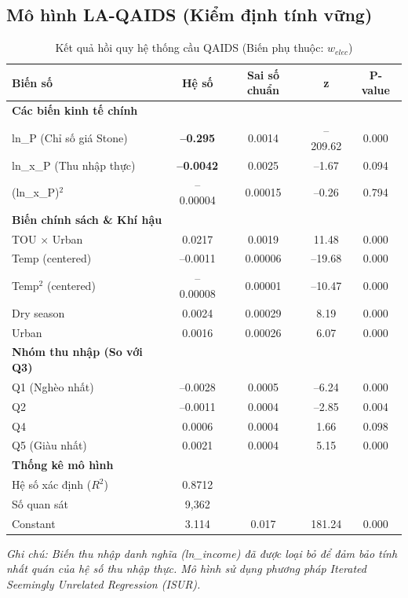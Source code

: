 \documentclass[12pt,a4paper,oneside]{article}
\begin{document}
\subsection{Mô hình LA-QAIDS (Kiểm định tính vững)}
\begin{table}[H]
	\centering
	\caption{Kết quả hồi quy hệ thống cầu QAIDS (Biến phụ thuộc: $w_{elec}$)}
	\label{tab:qaids_final}
	\begin{tabular}{l c c c c}
		\toprule
		\textbf{Biến số} & \textbf{Hệ số} & \textbf{Sai số chuẩn} & \textbf{z} & \textbf{P-value} \\
		\midrule
		\textbf{Các biến kinh tế chính} & & & & \\
		ln\_P (Chỉ số giá Stone) & \textbf{–0.295} & 0.0014 & –209.62 & 0.000 \\
		ln\_x\_P (Thu nhập thực) & \textbf{–0.0042} & 0.0025 & –1.67 & 0.094 \\
		(ln\_x\_P)$^2$ & –0.00004 & 0.00015 & –0.26 & 0.794 \\
		\midrule
		\textbf{Biến chính sách \& Khí hậu} & & & \\
		TOU $\times$ Urban & 0.0217 & 0.0019 & 11.48 & 0.000 \\
		Temp (centered) & –0.0011 & 0.00006 & –19.68 & 0.000 \\
		Temp$^2$ (centered) & –0.00008 & 0.00001 & –10.47 & 0.000 \\
		Dry season & 0.0024 & 0.00029 & 8.19 & 0.000 \\
		Urban & 0.0016 & 0.00026 & 6.07 & 0.000 \\
		\midrule
		\textbf{Nhóm thu nhập (So với Q3)} & & & & \\
		Q1 (Nghèo nhất) & –0.0028 & 0.0005 & –6.24 & 0.000 \\
		Q2 & –0.0011 & 0.0004 & –2.85 & 0.004 \\
		Q4 & 0.0006 & 0.0004 & 1.66 & 0.098 \\
		Q5 (Giàu nhất) & 0.0021 & 0.0004 & 5.15 & 0.000 \\
		\midrule
		\textbf{Thống kê mô hình} & & & & \\
		Hệ số xác định ($R^2$) & 0.8712 & & & \\
		Số quan sát & 9,362 & & & \\
		Constant & 3.114 & 0.017 & 181.24 & 0.000 \\
		\bottomrule
	\end{tabular}
	\footnotesize{\textit{Ghi chú: Biến thu nhập danh nghĩa (ln\_income) đã được loại bỏ để đảm bảo tính nhất quán của hệ số thu nhập thực. Mô hình sử dụng phương pháp Iterated Seemingly Unrelated Regression (ISUR).}}
\end{table}
\end{document}
